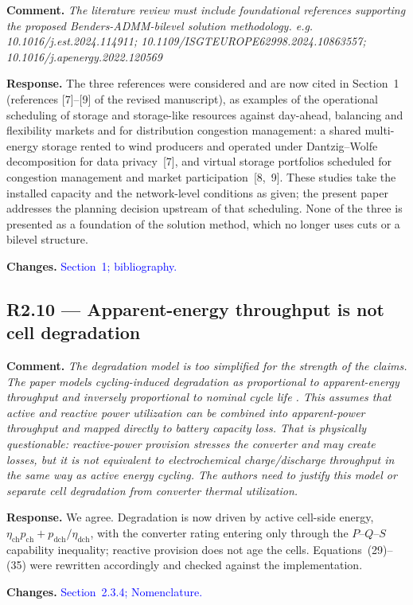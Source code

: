 \documentclass[11pt]{article}
\newcommand{\rcomment}[1]{\par\medskip\noindent\textbf{Comment.} \textit{#1}\par\smallskip}
\newcommand{\rresponse}[1]{\noindent\textbf{Response.} #1\par\smallskip}
\newcommand{\rchanges}[1]{\noindent\textbf{Changes.} \textcolor{blue}{#1}\par\medskip}
\begin{document}
\rcomment{
    The literature review must include foundational references supporting the proposed Benders-ADMM-bilevel solution methodology. e.g. 10.1016/j.est.2024.114911; 10.1109/ISGTEUROPE62998.2024.10863557; 10.1016/j.apenergy.2022.120569
}

\rresponse{
    The three references were considered and are now cited in Section~1 (references [7]--[9] of the revised manuscript), as examples of the operational scheduling of storage and storage-like resources against day-ahead, balancing and flexibility markets and for distribution congestion management: a shared multi-energy storage rented to wind producers and operated under Dantzig--Wolfe decomposition for data privacy~[7], and virtual storage portfolios scheduled for congestion management and market participation~[8,~9]. These studies take the installed capacity and the network-level conditions as given; the present paper addresses the planning decision upstream of that scheduling. None of the three is presented as a foundation of the solution method, which no longer uses cuts or a bilevel structure.
}

\rchanges{Section~1; bibliography.}

\subsection*{R2.10 --- Apparent-energy throughput is not cell degradation}
\rcomment{
The degradation model is too simplified for the strength of the claims. The paper models cycling-induced degradation as proportional to apparent-energy throughput and inversely proportional to nominal cycle life . This assumes that active and reactive power utilization can be combined into apparent-power throughput and mapped directly to battery capacity loss. That is physically questionable: reactive-power provision stresses the converter and may create losses, but it is not equivalent to electrochemical charge/discharge throughput in the same way as active energy cycling. The authors need to justify this model or separate cell degradation from converter thermal utilization.
}
\rresponse{We agree. Degradation is now driven by active cell-side energy,
$\eta_{\mathrm{ch}} p_{\mathrm{ch}} + p_{\mathrm{dch}}/\eta_{\mathrm{dch}}$, with the converter rating
entering only through the $P$--$Q$--$S$ capability inequality; reactive provision does not age the cells.
Equations~(29)--(35) were rewritten accordingly and checked against the implementation.}
\rchanges{Section~2.3.4; Nomenclature.}
\end{document}
